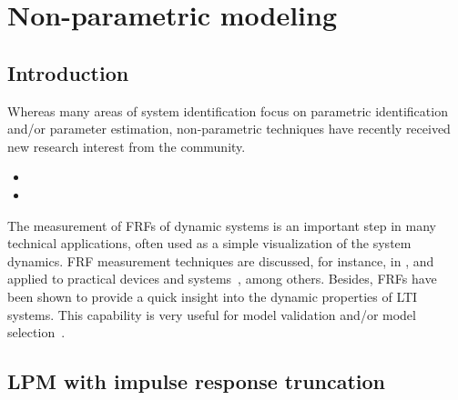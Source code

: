 \chapter{Non-parametric modeling}
\def\thisDir{ch03-lrm}
\label{sec:nonparametric}

\section{Introduction}
\label{sec:nonparametric:introduction}

Whereas many areas of system identification focus on parametric identification and/or parameter estimation, non-parametric techniques have recently received new research interest from the community.

\begin{itemize}
\item {}
\item {}
\end{itemize}

The measurement of \glspl{FRF} of dynamic systems is an important step in many technical applications, often used as a simple visualization of the system dynamics.
\gls{FRF} measurement techniques are discussed, for instance, in
\citep{Schoukens1998,Schoukens2006LPM,Guillaume1996,Broersen1995,Pintelon2010LPM1,Antoni2007FRF,Pintelon2012}, and applied to practical devices and systems~\citep{Lim2010,Robinson1990,Behjat2010}, among others.
Besides, \glspl{FRF} have been shown to provide a quick insight into the dynamic properties of \gls{LTI} systems.
This capability is very useful for model validation and/or model selection~\citep{Pintelon2012}.



\section{LPM with impulse response truncation}


\section{}


\subsection{}
